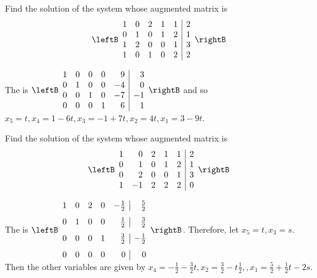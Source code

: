 \begin{enumialphparenastyle}
\begin{ex} Find the solution of the system whose augmented matrix is 
\begin{equation*}
\leftB
\begin{array}{rrrrr|r}
1 & 0 & 2 & 1 & 1 & 2 \\
0 & 1 & 0 & 1 & 2 & 1 \\
1 & 2 & 0 & 0 & 1 & 3 \\
1 & 0 & 1 & 0 & 2 & 2
\end{array}
\rightB 
\end{equation*}
\begin{sol}
The \rref \; is $\leftB
\begin{array}{rrrrr|r}
1 & 0 & 0 & 0 & 9 & 3 \\
0 & 1 & 0 & 0 & -4 & 0 \\
0 & 0 & 1 & 0 & -7 & -1 \\
0 & 0 & 0 & 1 & 6 & 1
\end{array}
\rightB $ and so $x_{5}=t,x_{4}=1-6t,x_{3}=-1+7t,x_{2}=4t,x_{1}=3-9t$.
\end{sol}
\end{ex}

\begin{ex} Find the solution of the system whose augmented matrix is 
\begin{equation*}
\leftB
\begin{array}{rrrrr|r}
1 & 0 & 2 & 1 & 1 & 2 \\
0 & 1 & 0 & 1 & 2 & 1 \\
0 & 2 & 0 & 0 & 1 & 3 \\
1 & -1 & 2 & 2 & 2 & 0
\end{array}
\rightB 
\end{equation*}
\begin{sol}
The \rref \;is $\leftB
\begin{array}{rrrrr|r}
1 & 0 & 2 & 0 & -\vspace{0.05in}\frac{1}{2} & \vspace{0.05in}\frac{5}{2} \\
0 & 1 & 0 & 0 & \vspace{0.05in}\frac{1}{2} & \vspace{0.05in}\frac{3}{2} \\
0 & 0 & 0 & 1 & \vspace{0.05in}\frac{3}{2} & -\vspace{0.05in}\frac{1}{2} \\
0 & 0 & 0 & 0 & 0 & 0
\end{array}
\rightB $. Therefore, let $x_{5}=t,x_{3}=s.$ Then the other variables are
given by $x_{4}=-\frac{1}{2}-\frac{3}{2}t,x_{2}=\frac{3}{2}-t\frac{1}{2}
,,x_{1}=\frac{5}{2}+\frac{1}{2}t-2s.$
\end{sol}
\end{ex}


\end{enumialphparenastyle}
